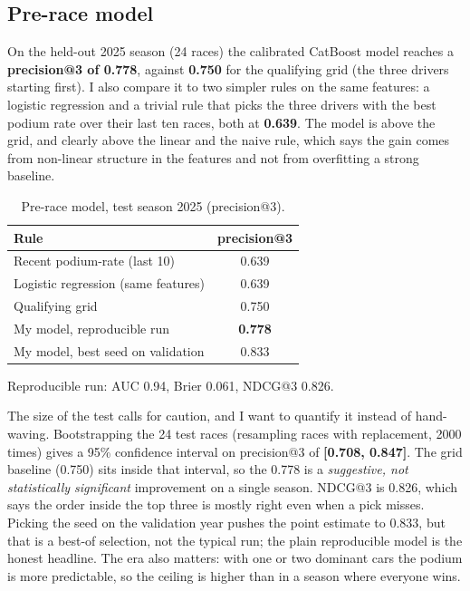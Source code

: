\documentclass[10pt,twocolumn]{article}
\begin{document}
\subsection{Pre-race model}
On the held-out 2025 season (24 races) the calibrated CatBoost model reaches a
\textbf{precision@3 of 0.778}, against \textbf{0.750} for the qualifying grid
(the three drivers starting first). I also compare it to two simpler rules on
the same features: a logistic regression and a trivial rule that picks the three
drivers with the best podium rate over their last ten races, both at
\textbf{0.639}. The model is above the grid, and clearly above the linear and
the naive rule, which says the gain comes from non-linear structure in the
features and not from overfitting a strong baseline.

\begin{table}[t]
\centering
\caption{Pre-race model, test season 2025 (precision@3).}
\label{tab:race}
\small
\begin{tabular}{@{}lc@{}}
\toprule
Rule & precision@3 \\
\midrule
Recent podium-rate (last 10) & 0.639 \\
Logistic regression (same features) & 0.639 \\
Qualifying grid              & 0.750 \\
My model, reproducible run & \textbf{0.778} \\
My model, best seed on validation & 0.833 \\
\bottomrule
\end{tabular}

\smallskip
\noindent\footnotesize Reproducible run: AUC 0.94, Brier 0.061, NDCG@3 0.826.
\end{table}

The size of the test calls for caution, and I want to quantify it instead of
hand-waving. Bootstrapping the 24 test races (resampling races with replacement,
2000 times) gives a 95\% confidence interval on precision@3 of
\textbf{[0.708, 0.847]}. The grid baseline (0.750) sits inside that interval, so
the 0.778 is a \emph{suggestive, not statistically significant} improvement on a
single season. NDCG@3 is 0.826, which says the order inside the top three is
mostly right even when a pick misses. Picking the seed on the validation year
pushes the point estimate to 0.833, but that is a best-of selection, not the
typical run; the plain reproducible model is the honest headline. The era also
matters: with one or two dominant cars the podium is more predictable, so the
ceiling is higher than in a season where everyone wins.
\end{document}
